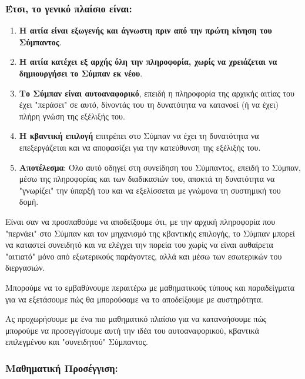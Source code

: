 \documentclass[a4paper,11pt]{article}
\begin{document}
\subsubsection{Έτσι, το γενικό πλαίσιο
είναι:}\label{ux3adux3c4ux3c3ux3b9-ux3c4ux3bf-ux3b3ux3b5ux3bdux3b9ux3baux3cc-ux3c0ux3bbux3b1ux3afux3c3ux3b9ux3bf-ux3c0ux3bfux3c5-ux3b4ux3b7ux3bcux3b9ux3bfux3c5ux3c1ux3b3ux3b5ux3afux3c2-ux3b5ux3afux3bdux3b1ux3b9}
\begin{enumerate}
\item
  \textbf{Η αιτία είναι εξωγενής και άγνωστη πριν από την πρώτη κίνηση
  του Σύμπαντος}.
\item
  \textbf{Η αιτία κατέχει εξ\textquotesingle{} αρχής όλη την πληροφορία,
  χωρίς να χρειάζεται να δημιουργήσει το Σύμπαν εκ νέου}.
\item
  \textbf{Το Σύμπαν είναι αυτοαναφορικό}, επειδή η πληροφορία της
  αρχικής αιτίας του έχει "περάσει" σε αυτό, δίνοντάς του τη δυνατότητα
  να κατανοεί (ή να έχει) πλήρη γνώση της εξέλιξής του.
\item
  \textbf{Η κβαντική επιλογή} επιτρέπει στο Σύμπαν να έχει τη δυνατότητα
  να επεξεργάζεται και να αποφασίζει για την κατεύθυνση της εξέλιξής
  του.
\item
  \textbf{Αποτέλεσμα}: Όλο αυτό οδηγεί στη συνείδηση του Σύμπαντος,
  επειδή το Σύμπαν, μέσω της πληροφορίας και των διαδικασιών του, αποκτά
  τη δυνατότητα να "γνωρίζει" την ύπαρξή του και να εξελίσσεται με
  γνώμονα τη συστημική του δομή.
\end{enumerate}
Είναι σαν να προσπαθούμε να αποδείξουμε ότι, με την αρχική πληροφορία
που "περνάει" στο Σύμπαν και τον μηχανισμό της κβαντικής επιλογής, το
Σύμπαν μπορεί να καταστεί συνειδητό και να ελέγχει την πορεία του χωρίς
να είναι αυθαίρετα "αιτιατό" μόνο από εξωτερικούς παράγοντες, αλλά και
μέσω των εσωτερικών του διεργασιών.

Μπορούμε να το εμβαθύνουμε περαιτέρω με μαθηματικούς τύπους
και παραδείγματα για να εξετάσουμε πώς θα μπορούσαμε να το αποδείξουμε
με αυστηρότητα.

{}
Ας προχωρήσουμε με ένα πιο μαθηματικό πλαίσιο για να
κατανοήσουμε πώς μπορούμε να προσεγγίσουμε αυτή την ιδέα του
αυτοαναφορικού, κβαντικά επιλεγμένου και "συνειδητού" Σύμπαντος.

\subsubsection{Μαθηματική
Προσέγγιση:}\label{ux3bcux3b1ux3b8ux3b7ux3bcux3b1ux3c4ux3b9ux3baux3ae-ux3c0ux3c1ux3bfux3c3ux3adux3b3ux3b3ux3b9ux3c3ux3b7}
\end{document}
